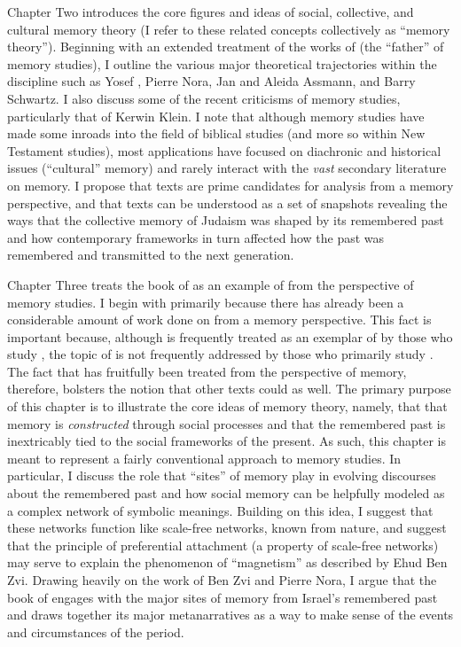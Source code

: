 Chapter Two introduces the core figures and ideas of social, collective, and cultural memory theory (I refer to these related concepts collectively as ``memory theory''). Beginning with an extended treatment of the works of \Halbwachs (the ``father'' of memory studies), I outline the various major theoretical trajectories within the discipline such as Yosef \yerushalmi, Pierre Nora, Jan and Aleida Assmann, and Barry Schwartz. I also discuss some of the recent criticisms of memory studies, particularly that of Kerwin Klein. I note that although memory studies have made some inroads into the field of biblical studies (and more so within New Testament studies), most applications have focused on diachronic and historical issues (``cultural'' memory) and rarely interact with the \emph{vast} secondary literature on memory. I propose that \rwb texts are prime candidates for analysis from a memory perspective, and that \rwb texts can be understood as a set of snapshots revealing the ways that the collective memory of \secondtemple Judaism was shaped by its remembered past and how contemporary frameworks in turn affected how the past was remembered and transmitted to the next generation.

Chapter Three treats the book of \chronicles as an example of \rwb from the perspective of memory studies. I begin with \chronicles primarily because there has already been a considerable amount of work done on \chronicles from a memory perspective. This fact is important because, although \chronicles is frequently treated as an exemplar of \rwb by those who study \rwb, the topic of \rwb is not frequently addressed by those who primarily study \chronicles. The fact that \chronicles has fruitfully been treated from the perspective of memory, therefore, bolsters the notion that other \rwb texts could as well. The primary purpose of this chapter is to illustrate the core ideas of memory theory, namely, that that memory is \emph{constructed} through social processes and that the remembered past is inextricably tied to the social frameworks of the present.  As such, this chapter is meant to represent a fairly conventional approach to memory studies. In particular, I discuss the role that ``sites'' of memory play in evolving discourses about the remembered past and how social memory can be helpfully modeled as a complex network of symbolic meanings. Building on this idea, I suggest that these networks function like scale-free networks, known from nature, and suggest that the principle of preferential attachment (a property of scale-free networks) may serve to explain the phenomenon of ``magnetism'' as described by Ehud Ben Zvi. Drawing heavily on the work of Ben Zvi and Pierre Nora, I argue that the book of \chronicles engages with the major sites of memory from Israel's remembered past and draws together its major metanarratives as a way to make sense of the events and circumstances of the \secondtemple period.

